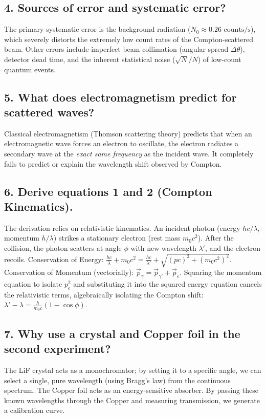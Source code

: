 \documentclass[a4paper,11pt]{article}
\begin{document}
\subsection*{4. Sources of error and systematic error?}
The primary systematic error is the background radiation ($N_0 \approx 0.26\text{ counts/s}$), which severely distorts the extremely low count rates of the Compton-scattered beam. Other errors include imperfect beam collimation (angular spread $\Delta\theta$), detector dead time, and the inherent statistical noise ($\sqrt{N}/N$) of low-count quantum events.

\subsection*{5. What does electromagnetism predict for scattered waves?}
Classical electromagnetism (Thomson scattering theory) predicts that when an electromagnetic wave forces an electron to oscillate, the electron radiates a secondary wave at the \textit{exact same frequency} as the incident wave. It completely fails to predict or explain the wavelength shift observed by Compton.

\subsection*{6. Derive equations 1 and 2 (Compton Kinematics).}
The derivation relies on relativistic kinematics. An incident photon (energy $hc/\lambda$, momentum $h/\lambda$) strikes a stationary electron (rest mass $m_0 c^2$). After the collision, the photon scatters at angle $\phi$ with new wavelength $\lambda'$, and the electron recoils.
Conservation of Energy: $\frac{hc}{\lambda} + m_0 c^2 = \frac{hc}{\lambda'} + \sqrt{(pc)^2 + (m_0 c^2)^2}$.
Conservation of Momentum (vectorially): $\vec{p}_{\gamma} = \vec{p}_{\gamma'} + \vec{p}_e$.
Squaring the momentum equation to isolate $p_e^2$ and substituting it into the squared energy equation cancels the relativistic terms, algebraically isolating the Compton shift: $\lambda' - \lambda = \frac{h}{m_0 c} (1 - \cos\phi)$.

\subsection*{7. Why use a crystal and Copper foil in the second experiment?}
The LiF crystal acts as a monochromator; by setting it to a specific angle, we can select a single, pure wavelength (using Bragg's law) from the continuous spectrum. The Copper foil acts as an energy-sensitive absorber. By passing these known wavelengths through the Copper and measuring transmission, we generate a calibration curve.
\end{document}
